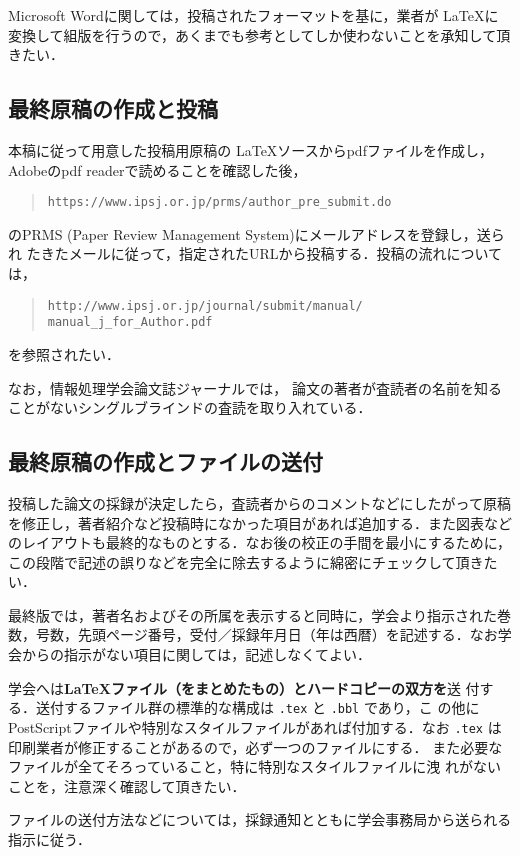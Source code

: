 \documentclass[submit,techrep]{ipsj}
\def\|{\verb|}
\begin{document}
Microsoft Wordに関しては，投稿されたフォーマットを基に，業者が \LaTeX に
変換して組版を行うので，あくまでも参考としてしか使わないことを承知して頂
きたい．

%2.2
\subsection{最終原稿の作成と投稿}

本稿に従って用意した投稿用原稿の \LaTeX ソースからpdfファイルを作成し，
Adobeのpdf readerで読めることを確認した後，
\begin{quote}
\small
\|https://www.ipsj.or.jp/prms/author_pre_submit.do|
\end{quote}
のPRMS (Paper Review Management System)にメールアドレスを登録し，送られ
たきたメールに従って，指定されたURLから投稿する．投稿の流れについては，
\begin{quote}
\small
\|http://www.ipsj.or.jp/journal/submit/manual/|
\|manual_j_for_Author.pdf|
\end{quote}
を参照されたい．

なお，情報処理学会論文誌ジャーナルでは，
論文の著者が査読者の名前を知ることがないシングルブラインドの査読を取り入れている．

\subsection{最終原稿の作成とファイルの送付}

投稿した論文の採録が決定したら，査読者からのコメントなどにしたがって原稿
を修正し，著者紹介など投稿時になかった項目があれば追加する．また図表など
のレイアウトも最終的なものとする．なお後の校正の手間を最小にするために，
この段階で記述の誤りなどを完全に除去するように綿密にチェックして頂きたい．

最終版では，著者名およびその所属を表示すると同時に，学会より指示された巻
数，号数，先頭ページ番号，受付／採録年月日（年は西暦）を記述する．なお学
会からの指示がない項目に関しては，記述しなくてよい．

学会へは{\bf \LaTeX ファイル（をまとめたもの）とハードコピーの双方を}送
付する．送付するファイル群の標準的な構成は \|.tex| と \|.bbl| であり，こ
の他にPostScriptファイルや特別なスタイルファイルがあれば付加する．なお 
\|.tex| は印刷業者が修正することがあるので，{必ず一つのファイルにする}．
また必要なファイルが全てそろっていること，特に特別なスタイルファイルに洩
れがないことを，注意深く確認して頂きたい．

ファイルの送付方法などについては，採録通知とともに学会事務局から送られる
指示に従う．
\end{document}
